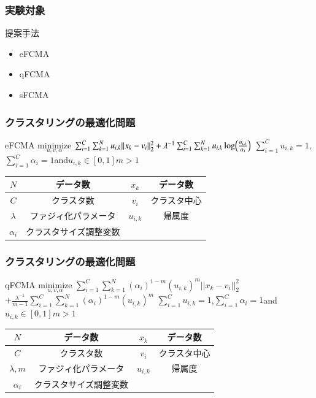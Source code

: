 \documentclass[13pt,dvipdfmx]{beamer}
\begin{document}
\begin{frame}\frametitle{実験対象}
 \begin{block}{提案手法}
   \begin{itemize}
    \item eFCMA
    \item qFCMA
    \item sFCMA
   \end{itemize}
 \end{block}
\end{frame}

\begin{frame}\frametitle{クラスタリングの最適化問題}
  \begin{block}{eFCMA}
  \quad$\underset{u,v,\alpha}{\text{minimize}}$
    $\sum_{i=1}^C\sum_{k=1}^Nu_{i,k}||x_k-v_i||_2^2+\lambda^{-1}\sum_{i=1}^C\sum_{k=1}^Nu_{i,k}\log\Bigl(\frac{u_{i,k}}{\alpha_{i}}\Bigl)$
    $\sum_{i=1}^Cu_{i,k}=1$\;,\;$\sum_{i=1}^C\alpha_{i}=1$\;and\;$u_{i,k}\in[0,1]$\quad$m>1$
  \end{block}
  \begin{center}
\begin{tabular}{c|c||c|c} \hline
	{$N$}&データ数&{$x_k$}&データ数 \\ \hline
	{$C$}&クラスタ数&{$v_i$}&クラスタ中心\\ \hline
	{$\lambda$}&ファジィ化パラメータ&{$u_{i,k}$}&帰属度 \\ \hline
	{$\alpha_i$}&クラスタサイズ調整変数\\ \hline
\end{tabular}
\end{center}
\end{frame}

\begin{frame}\frametitle{クラスタリングの最適化問題}
  \begin{block}{qFCMA}
    \quad$\underset{u,v,\alpha}{\text{minimize}}$
    $\sum_{i=1}^C\sum_{k=1}^N(\alpha_{i})^{1-m}(u_{i,k})^m||x_k-v_i||_2^2$\\
    \qquad\qquad\qquad\qquad$+\frac{\lambda^{-1}}{m-1}\sum_{i=1}^C\sum_{k=1}^N(\alpha_{i})^{1-m}(u_{i,k})^m$
    $\sum_{i=1}^Cu_{i,k}=1$\;,\;$\sum_{i=1}^C\alpha_{i}=1$\;and\;$u_{i,k}\in[0,1]$\quad$m>1$
  \end{block}
  \begin{center}
\begin{tabular}{c|c||c|c} \hline
	{$N$}&データ数&{$x_k$}&データ数 \\ \hline
	{$C$}&クラスタ数&{$v_i$}&クラスタ中心\\ \hline
	{$\lambda,m$}&ファジィ化パラメータ&{$u_{i,k}$}&帰属度 \\ \hline
	{$\alpha_i$}&クラスタサイズ調整変数\\ \hline
\end{tabular}
\end{center}
\end{frame}
\end{document}
